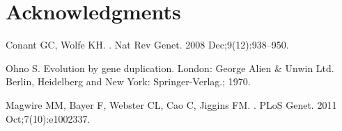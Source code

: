 \documentclass[10pt,letterpaper]{article}
\begin{document}
\section*{Acknowledgments}


\nolinenumbers

%
%
% 
\begin{thebibliography}{10}

Conant GC, Wolfe KH.
.
\newblock Nat Rev Genet. 2008 Dec;9(12):938--950.

Ohno S.
\newblock Evolution by gene duplication.
\newblock London: George Alien \& Unwin Ltd. Berlin, Heidelberg and New York:
  Springer-Verlag.; 1970.

Magwire MM, Bayer F, Webster CL, Cao C, Jiggins FM.
.
\newblock PLoS Genet. 2011 Oct;7(10):e1002337.

\end{thebibliography}
\end{document}
